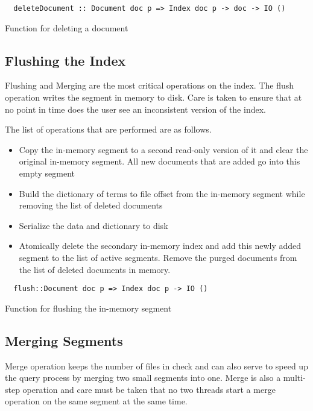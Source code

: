 \begin{listing}
\begin{verbatim}
  deleteDocument :: Document doc p => Index doc p -> doc -> IO ()
\end{verbatim}
\caption{Function for deleting a document}
\end{listing}

\subsection{Flushing the Index}
Flushing and Merging are the most critical operations on the index.
The flush operation writes the segment in memory to disk. Care is taken to ensure that at no point in time does the user see an inconsistent version of the index.

The list of operations that are performed are as follows.
\begin{itemize}
\item Copy the in-memory segment to a second read-only version of it and clear the original in-memory segment.
All new documents that are added go into this empty segment
\item Build the dictionary of terms to file offset from the in-memory segment while removing the list of deleted documents
\item Serialize the data and dictionary to disk
\item Atomically delete the secondary in-memory index and add this newly added segment to the list of active segments.
Remove the purged documents from the list of deleted documents in memory.
\end{itemize}

\begin{listing}
\begin{verbatim}
  flush::Document doc p => Index doc p -> IO ()
\end{verbatim}
\caption{Function for flushing the in-memory segment}
\end{listing}

\subsection{Merging Segments}
Merge operation keeps the number of files in check and can also serve to speed up the query process by merging two small segments into one.
Merge is also a multi-step operation and care must be taken that no two threads start a merge operation on the same segment at the same time.

